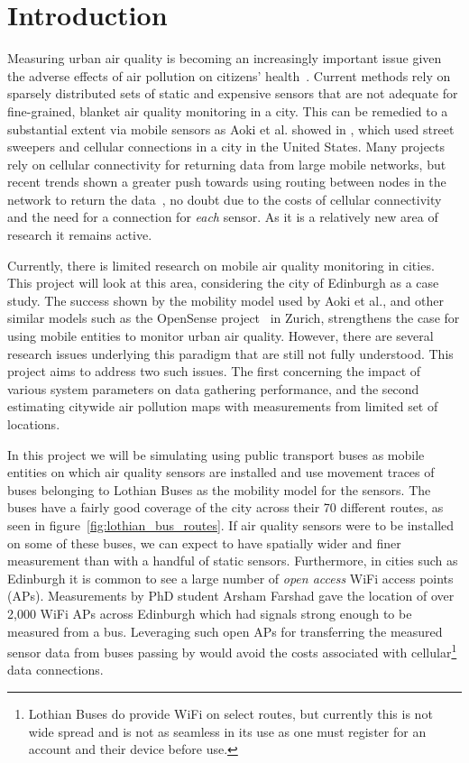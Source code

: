 \chapter{Introduction}\label{introduction}

    Measuring urban air quality is becoming an increasingly important issue given the adverse effects of air pollution on citizens' health~\cite{beijing2point5high}. Current methods rely on sparsely distributed sets of static and expensive sensors that are not adequate for fine-grained, blanket air quality monitoring in a city. This can be remedied to a substantial extent via mobile sensors as Aoki et al. showed in \cite{vehicleforresearch}, which used street sweepers and cellular connections in a city in the United States. Many projects rely on cellular connectivity for returning data from large mobile networks, but recent trends shown a greater push towards using routing between nodes in the network to return the data~\cite{manetmessaging,cafnet,cartel,commonsense}, no doubt due to the costs of cellular connectivity and the need for a connection for \emph{each} sensor. As it is a relatively new area of research it remains active. 

    Currently, there is limited research on mobile air quality monitoring in cities. This project will look at this area, considering the city of Edinburgh as a case study. The success shown by the mobility model used by Aoki et al., and other similar models such as the OpenSense project~\cite{opensensezurich} in Zurich, strengthens the case for using mobile entities to monitor urban air quality. However, there are several research issues underlying this paradigm that are still not fully understood. This project aims to address two such issues. The first concerning the impact of various system parameters on data gathering performance, and the second estimating citywide air pollution maps with measurements from limited set of locations. 

    In this project we will be simulating using public transport buses as mobile entities on which air quality sensors are installed and use movement traces of buses belonging to Lothian Buses as the mobility model for the sensors. The buses have a fairly good coverage of the city across their 70 different routes, as seen in figure~\ref{fig:lothian_bus_routes}. If air quality sensors were to be installed on some of these buses, we can expect to have spatially wider and finer measurement than with a handful of static sensors. Furthermore, in cities such as Edinburgh it is common to see a large number of \emph{open access} WiFi access points (APs). Measurements by PhD student Arsham Farshad gave the location of over 2,000 WiFi APs across Edinburgh which had signals strong enough to be measured from a bus. Leveraging such open APs for transferring the measured sensor data from buses passing by would avoid the costs associated with cellular\footnote{Lothian Buses do provide WiFi on select routes, but currently this is not wide spread and is not as seamless in its use as one must register for an account and their device before use.} data connections. 

